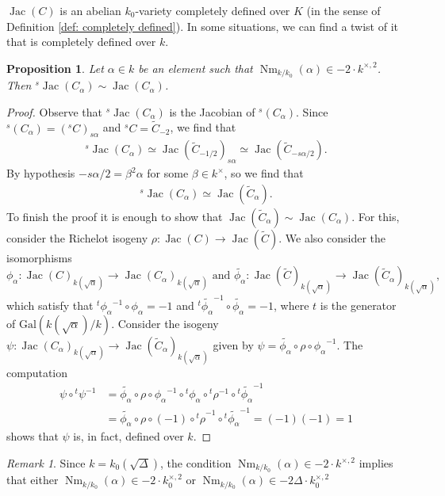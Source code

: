 \documentclass[oneside]{amsart}
\newtheorem{proposition}[theorem]{Proposition}
\theoremstyle{remark}
\newtheorem{remark}[theorem]{Remark}
\newcommand{\on}{\operatorname }
\newcommand{\ra}{\rightarrow}
\newcommand{\Gal}{\mathrm{Gal}}
\newcommand{\Jac}{\operatorname{Jac}}
\newcommand{\Nm}{\operatorname{Nm}}
\numberwithin{equation}{section}
\begin{document}
$\Jac(C)$ is an abelian $k_0$-variety completely defined over $K$ (in the sense of Definition \ref{def: completely defined}).  In some situations, we can find a twist of it that is completely defined over $k$.
\begin{proposition}\label{prop:alpha}
 Let $\alpha\in k$ be an element such that $\Nm_{k/k_0}(\alpha)\in -2\cdot  k^{\times,2}$. Then ${}^{s} \Jac(C_\alpha)\sim \Jac(C_\alpha)$.
\end{proposition}
\begin{proof}
  Observe that ${{}^{s}\Jac}(C_\alpha)$ is the Jacobian of $^{{s}}(C_\alpha)$. Since $^{{s}}(C_\alpha) = \left({}^{s} C\right)_{{s} \alpha}$ and ${}^{s} C = \tilde{C}_{-2}$, we find that
  \begin{align*}
    ^{{s}}\Jac(C_\alpha) \simeq  \Jac(\tilde{C}_{-1/2})_{{s}\alpha}\simeq \Jac(\tilde{C}_{-{s} \alpha/2}).
  \end{align*}
By hypothesis $-{s} \alpha /2= \beta^2\alpha$ for some $\beta\in k^\times$, so we find that
\begin{align*}
    ^{{s}}\Jac(C_\alpha) \simeq \Jac(\tilde{C}_\alpha).
\end{align*}
To finish the proof it is enough to show that $\Jac(\tilde{C}_\alpha)\sim \Jac(C_\alpha)$. For this, consider the Richelot isogeny $\rho\colon \Jac(C)\ra \Jac(\tilde{C})$. We also consider the isomorphisms
\[
{\phi_\alpha}\colon \Jac(C)_{k(\sqrt{\alpha})} \ra \Jac(C_\alpha)_{k(\sqrt{\alpha})}\text{ and }\tilde{\phi_\alpha}\colon \Jac(\tilde{C})_{k(\sqrt{\alpha})}\ra\Jac(\tilde{C}_\alpha)_{k(\sqrt{\alpha})},
\]
which satisfy that ${}^{t}{\phi_\alpha}^{-1}\circ {\phi_\alpha}=-1$  and ${}^{t}\tilde{\phi_\alpha}^{-1}\circ \tilde{\phi_\alpha}=-1$, where ${t}$ is the generator of $\Gal(k(\sqrt{\alpha})/k)$. Consider the isogeny $\psi\colon \Jac(C_\alpha)_{k(\sqrt{\alpha})}\ra \Jac(\tilde{C}_\alpha)_{k(\sqrt{\alpha})}$ given by $\psi = \tilde{{\phi_\alpha}}\circ \rho\circ {\phi_\alpha}^{-1}$. The computation
\begin{align*}
  \psi\circ {}^{t}\psi^{-1}  &= \tilde{{\phi_\alpha}}\circ \rho\circ {\phi_\alpha}^{-1} \circ {^{{t}}{\phi_\alpha}} \circ {^{{t}}\rho^{-1}} \circ {^{{t}}\tilde{{\phi_\alpha}}^{-1}}\\
&=  \tilde{{\phi_\alpha}}\circ \rho\circ (-1)\circ{{}^{t}\rho}^{-1} \circ {^{{t}}\tilde{{\phi_\alpha}}^{-1}} = (-1) (-1 ) = 1
\end{align*}
shows that $\psi$ is, in fact, defined over $k$.
\end{proof}
\begin{remark}
  Since $k=k_0(\sqrt{\Delta})$, the condition $\Nm_{k/k_0}(\alpha)\in -2\cdot  k^{\times,2}$ implies that either  $\on{Nm}_{k/k_0}(\alpha) \in -2\cdot k_0^{\times,2}$ or $\on{Nm}_{k/k_0}(\alpha) \in -2\Delta\cdot k_0^{\times,2}$
\end{remark}
\end{document}
